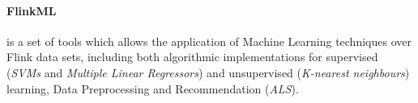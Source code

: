 \paragraph{FlinkML} is a set of tools which allows the application of Machine Learning techniques over Flink data sets, including both algorithmic implementations for supervised (\textit{SVMs} and \textit{Multiple Linear Regressors}) and unsupervised (\textit{K-nearest neighbours}) learning, Data Preprocessing and Recommendation (\textit{ALS}).


